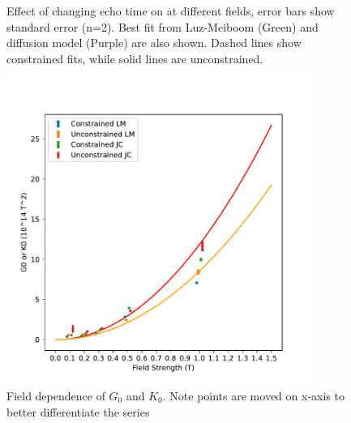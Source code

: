 \begin{figure}[h!t]

  \caption[Luz-Meiboom and diffusion model fits at different fields]{Effect of changing echo time on \Ttwo at different fields, error bars show standard error (n=2). Best fit from Luz-Meiboom (Green) and diffusion model (Purple) are also shown. Dashed lines show constrained fits, while solid lines are unconstrained.}
  \label{fig:dm-fitResults}
\end{figure}
\begin{figure}[h]
\centering
\includegraphics[width=10cm]{figures/diffmodels/G0K0field.pdf}
\caption[Field dependence of $G_0$ and $K_0$]{Field dependence of $G_0$ and $K_0$. Note points are moved on x-axis to better differentiate the series}
\label{fig:dm-KGfield}
\end{figure}

